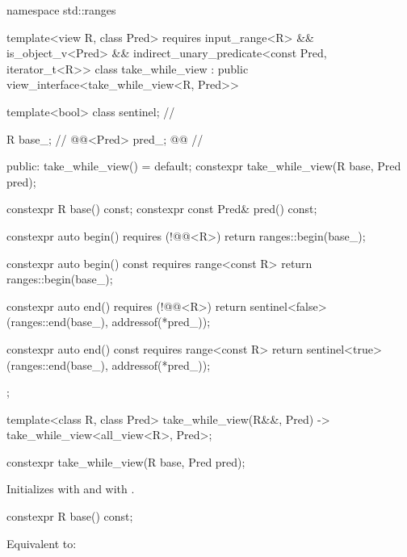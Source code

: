%
\begin{codeblock}
namespace std::ranges {
  template<view R, class Pred>
  requires input_range<R> && is_object_v<Pred> &&
    indirect_unary_predicate<const Pred, iterator_t<R>>
  class take_while_view : public view_interface<take_while_view<R, Pred>> {
    template<bool> class sentinel;                      // \expos

    R base_;                                            // \expos
    @@<Pred> pred_; @\itcorr[-1]@                       // \expos

  public:
    take_while_view() = default;
    constexpr take_while_view(R base, Pred pred);

    constexpr R base() const;
    constexpr const Pred& pred() const;

    constexpr auto begin() requires (!@@<R>)
    { return ranges::begin(base_); }

    constexpr auto begin() const requires range<const R>
    { return ranges::begin(base_); }

    constexpr auto end() requires (!@@<R>)
    { return sentinel<false>(ranges::end(base_), addressof(*pred_)); }

    constexpr auto end() const requires range<const R>
    { return sentinel<true>(ranges::end(base_), addressof(*pred_)); }
  };

  template<class R, class Pred>
    take_while_view(R&&, Pred) -> take_while_view<all_view<R>, Pred>;
}
\end{codeblock}

%
\begin{itemdecl}
constexpr take_while_view(R base, Pred pred);
\end{itemdecl}

\begin{itemdescr}
\pnum
\effects
Initializes  with  and
 with .
\end{itemdescr}

%
\begin{itemdecl}
constexpr R base() const;
\end{itemdecl}

\begin{itemdescr}
\pnum
\effects
Equivalent to: 
\end{itemdescr}

